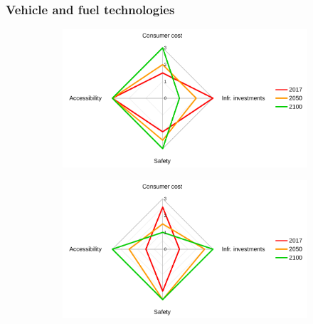\subsubsection*{Vehicle and fuel technologies}
%
\begin{figure}
		\centering
  \begin{subfigure}{0.8\textwidth}
    \includegraphics[width=\linewidth]{figures/radar_automobility.pdf}
    \caption{}
    \label{fig:results:radar_automobility}
  \end{subfigure}
  \begin{subfigure}{0.8\textwidth}
    \includegraphics[width=\linewidth]{figures/radar_public-transport.pdf}
    \caption{}
    \label{fig:results:radar_public-transport}
  \end{subfigure}
  \caption[]{}
\end{figure}